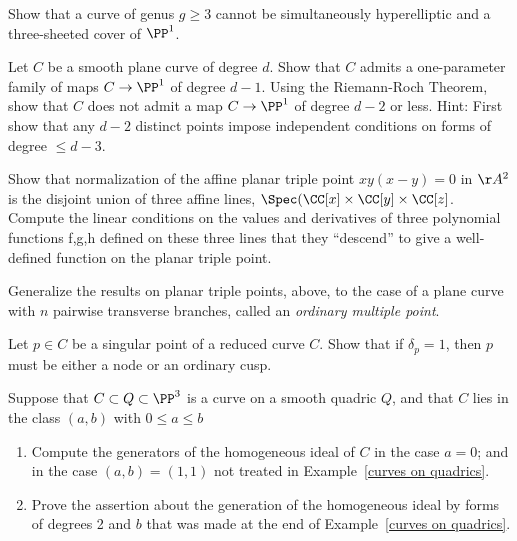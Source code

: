 \begin{exercise}\label{gonality exclusion}
Show that a curve of genus $g \geq 3$ cannot be simultaneously hyperelliptic and a three-sheeted cover of $\PP^1$.
\end{exercise}

\begin{exercise}\label{gonality of smooth plane curve}
Let $C$ be a smooth plane curve of degree $d$. Show that $C$ admits a one-parameter family of maps $C \to \PP^1$ of degree $d-1$. Using the Riemann-Roch Theorem, show that $C$ does not admit a map $C \to \PP^1$ of degree $d-2$ or less. Hint: First show that any $d-2$ distinct points impose independent conditions
on forms of degree $ \leq d-3$.
\end{exercise}

\begin{exercise}\label{planar triple pt}
Show that normalization of the affine planar triple point $xy(x-y) = 0$ in $\AA^2$ is the disjoint union of three
affine lines, $\Spec(\CC[x] \times \CC[y]\times \CC[z]$. Compute the linear conditions on the values and derivatives of three polynomial functions f,g,h defined on
these three lines that they ``descend'' to give a well-defined function on the planar triple point.
\end{exercise}

\begin{exercise} Generalize the results on planar triple points, above, to the case of a plane curve with $n$ pairwise
transverse branches, called an \emph{ordinary multiple point}.
\end{exercise}

\begin{exercise}\label{delta=1 characterization}
Let $p \in C$ be a singular point of a reduced curve $C$. Show that if $\delta_p = 1$, then $p$ must be either a node or an ordinary cusp.
\end{exercise}

\begin{exercise}\label{curve on rank 4 quadric}
 Suppose that $C\subset Q\subset \PP^{3}$ is a curve on a smooth quadric $Q$, and that $C$ lies
 in the class $(a,b)$ with $0\leq a\leq b$
 
\begin{enumerate}
 \item Compute the generators of the homogeneous ideal of $C$ in the case $a=0$; and in the case
 $(a,b) = (1,1)$ not treated in Example~\ref{curves on quadrics}.
 \item Prove the assertion about the generation of the homogeneous ideal by forms of degrees 2 and $b$
 that was made at the end of Example~\ref{curves on quadrics}.
\end{enumerate}
\end{exercise}

 